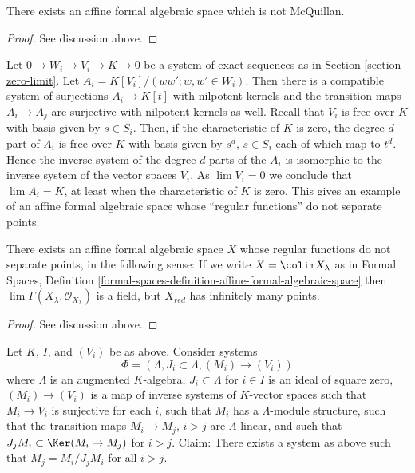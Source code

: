 \begin{lemma}
\label{lemma-affine-not-mcquillan}
There exists an affine formal algebraic space which is not McQuillan.
\end{lemma}

\begin{proof}
See discussion above.
\end{proof}

\noindent
Let $0 \to W_i \to V_i \to K \to 0$ be a system of exact sequences
as in Section \ref{section-zero-limit}. Let
$A_i = K[V_i]/(ww'; w, w' \in W_i)$.
Then there is a compatible system of surjections $A_i \to K[t]$
with nilpotent kernels and
the transition maps $A_i \to A_j$ are surjective with nilpotent
kernels as well. Recall that $V_i$ is free over $K$ with
basis given by $s \in S_i$. Then, if the characteristic of $K$ is zero,
the degree $d$ part of $A_i$ is free over $K$ with basis given by
$s^d$, $s \in S_i$ each of which map to $t^d$. Hence the inverse system of
the degree $d$ parts of the $A_i$ is isomorphic to the inverse
system of the vector spaces $V_i$. As $\lim V_i = 0$ we conclude that
$\lim A_i = K$, at least when the characteristic of $K$ is zero.
This gives an example of an affine formal algebraic space
whose ``regular functions'' do not separate points.

\begin{lemma}
\label{lemma-affine-formal-functions-do-not-separate-points}
There exists an affine formal algebraic space $X$
whose regular functions do not separate points, in the following sense:
If we write $X = \colim X_\lambda$ as in
Formal Spaces, Definition
\ref{formal-spaces-definition-affine-formal-algebraic-space}
then $\lim \Gamma(X_\lambda, \mathcal{O}_{X_\lambda})$
is a field, but $X_{red}$ has infinitely many points.
\end{lemma}

\begin{proof}
See discussion above.
\end{proof}

\noindent
Let $K$, $I$, and $(V_i)$ be as above. Consider systems
$$
\Phi = (\Lambda, J_i \subset \Lambda, (M_i) \to (V_i))
$$
where $\Lambda$ is an augmented $K$-algebra,
$J_i \subset \Lambda$ for $i \in I$ is an ideal of square zero,
$(M_i) \to (V_i)$ is a map of inverse systems of $K$-vector spaces
such that $M_i \to V_i$ is surjective for each $i$, such that
$M_i$ has a $\Lambda$-module structure, such that the transition maps
$M_i \to M_j$, $i > j$ are $\Lambda$-linear, and such that
$J_j M_i \subset \Ker(M_i \to M_j)$ for $i > j$.
Claim: There exists a system as above such that $M_j = M_i/J_j M_i$
for all $i > j$.

